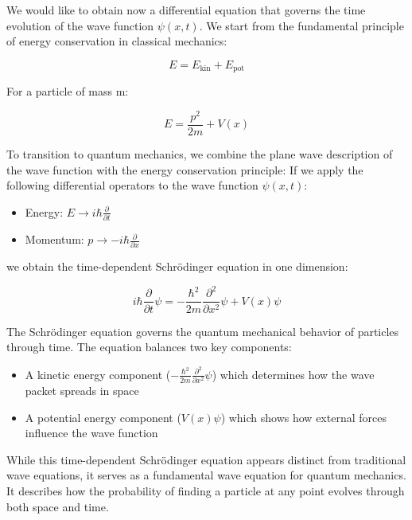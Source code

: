 \documentclass[
  a4paper,
]{book}
\providecommand{\tightlist}{%
  \setlength{\itemsep}{0pt}\setlength{\parskip}{0pt}}
\begin{document}
We would like to obtain now a differential equation that governs the
time evolution of the wave function \(\psi(x,t)\). We start from the
fundamental principle of energy conservation in classical mechanics:

\[E = E_{\text{kin}} + E_{\text{pot}}\]

For a particle of mass m:

\[E = \frac{p^2}{2m} + V(x)\]

To transition to quantum mechanics, we combine the plane wave
description of the wave function with the energy conservation principle:
If we apply the following differential operators to the wave function
\(\psi(x,t)\):

\begin{itemize}
\tightlist
\item
  Energy: \(E \rightarrow i\hbar\frac{\partial}{\partial t}\)
\item
  Momentum: \(p \rightarrow -i\hbar\frac{\partial}{\partial x}\)
\end{itemize}

we obtain the time-dependent Schrödinger equation in one dimension:

\[i\hbar\frac{\partial}{\partial t}\psi = -\frac{\hbar^2}{2m}\frac{\partial^2}{\partial x^2}\psi + V(x)\psi\]

The Schrödinger equation governs the quantum mechanical behavior of
particles through time. The equation balances two key components:

\begin{itemize}
\tightlist
\item
  A kinetic energy component
  (\(-\frac{\hbar^2}{2m}\frac{\partial^2}{\partial x^2}\psi\)) which
  determines how the wave packet spreads in space
\item
  A potential energy component (\(V(x)\psi\)) which shows how external
  forces influence the wave function
\end{itemize}

While this time-dependent Schrödinger equation appears distinct from
traditional wave equations, it serves as a fundamental wave equation for
quantum mechanics. It describes how the probability of finding a
particle at any point evolves through both space and time.
\end{document}
